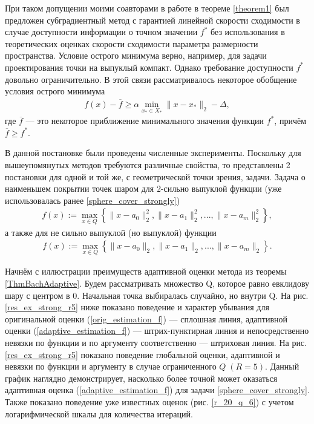     При таком допущении моими соавторами в работе \cite{sharp22} в теореме \ref{theorem1} был предложен субградиентный метод с гарантией  линейной скорости сходимости в случае доступности информации о точном значении $f^*$ \cite{6} без использования в теоретических оценках скорости сходимости  параметра размерности пространства. Условие острого минимума верно, например, для задачи проектирования точки на выпуклый компакт. Однако требование доступности $f^*$ довольно ограничительно. В этой связи рассматривалось некоторое обобщение условия острого минимума
    \begin{gather}\label{eq_gen_sharp}
        f(x) - \overline{f} \geq \alpha \min_{x_* \in X_*} \|x - x_* \|_2 - \Delta,
    \end{gather}
    где $\overline{f}$  --- это некоторое приближение минимального значения функции $f^*$, причём $\overline{f} \geq f^*$. 

    В данной постановке были проведены численные эксперименты. Поскольку для вышеупомянутых методов требуются различные свойства, то представлены 2 постановки для одной и той же, с геометрической точки зрения, задачи. Задача о наименьшем покрытии точек шаром для $2$-сильно выпуклой функции (уже использовалась ранее \eqref{sphere_cover_strongly})
    \begin{gather}
        f(x) := \max_{x\in Q}\left\{\|x - a_0\|_2^2, \|x - a_1\|_2^2, ..., \|x - a_m\|_2^2\right\},
    \end{gather}
    а также для не сильно выпуклой (но выпуклой) функции
    \begin{gather}\label{sphere_cover}
        f(x) := \max_{x\in Q}\left\{\|x - a_0\|_2, \|x - a_1\|_2, ..., \|x - a_m\|_2\right\}.
    \end{gather}

    Начнём с иллюстрации преимуществ адаптивной оценки метода \cite{Bach_2012} из теоремы \ref{ThmBachAdaptive}. Будем рассматривать множество Q, которое равно евклидову шару с центром в 0. Начальная точка выбиралась случайно, но внутри Q. На рис. \ref{res_ex_strong_r5} ниже показано поведение и характер убывания для оригинальной оценки (\ref{orig_estimation_f}) --- сплошная линия, адаптивной оценки (\ref{adaptive_estimation_f}) --- штрих-пунктирная линия и непосредственно невязки по функции и по аргументу соответственно --- штриховая линия. На рис. \ref{res_ex_strong_r5} показано поведение глобальной оценки, адаптивной и невязки по функции и аргументу в случае ограниченного $Q \;(R = 5)$. Данный график наглядно демонстрирует, насколько более точной может оказаться адаптивная оценка (\ref{adaptive_estimation_f}) для задачи \eqref{sphere_cover_strongly}. Также показано поведение уже известных оценок (рис. \ref{r_20_q_6}) с учетом логарифмической шкалы для количества итераций.

